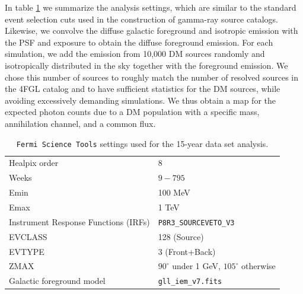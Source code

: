 \documentclass[12pt, a4paper]{article}
\begin{document}
In table \ref{tab:settings} we summarize the analysis settings, which are similar to the standard event selection cuts used in the construction of gamma-ray source catalogs. 
Likewise, we convolve the diffuse galactic foreground and isotropic emission with the PSF and exposure to obtain the diffuse foreground emission.
For each simulation, we add the emission from 10,000 DM sources randomly and isotropically distributed in the sky together with the foreground emission. We chose this number of sources to roughly match the number of resolved sources in the 4FGL catalog and to have sufficient statistics for the DM sources, while avoiding excessively demanding simulations. We thus obtain a map for the expected photon counts due to a DM population with a specific mass, annihilation channel, and a common flux.

\begin{table}[t]
\centering
\begin{tabular}{ | l| l|  }
\hline
Healpix order & 8\\ 
Weeks & $9-795$\\ 
Emin & 100 MeV\\
Emax & 1 TeV\\
Instrument Response Functions (IRFs) & \verb|P8R3_SOURCEVETO_V3| \\
EVCLASS & 128 (Source)\\ 
EVTYPE & 3 (Front+Back)\\
ZMAX & $90^\circ$ under 1 GeV, $105^\circ$ otherwise\\
Galactic foreground model & \verb|gll_iem_v7.fits| \\
\hline
\end{tabular}
\caption{\texttt{Fermi Science Tools} settings used for the 15-year data set analysis.}
\label{tab:settings}
\end{table}
\end{document}
